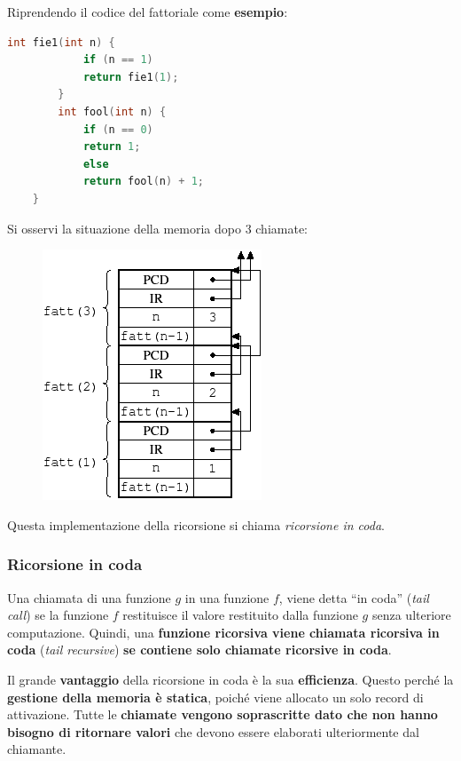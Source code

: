 \documentclass[a4paper]{article}
\newcommand{\dquotes}[1]{``#1''}
\begin{document}
	\noindent
	Riprendendo il codice del fattoriale come \textcolor{Green4}{\textbf{esempio}}:
	\begin{lstlisting}[language=C]
		int fie1(int n) {
			if (n == 1)
			return fie1(1);
		}
		int fool(int n) {
			if (n == 0)
			return 1;
			else
			return fool(n) + 1;
	}\end{lstlisting}
	Si osservi la situazione della memoria dopo 3 chiamate:
	\begin{figure}[!htp]
		\centering
		\includegraphics[width=.5\textwidth]{img/ricorsione.png}
	\end{figure}
	
	\noindent
	Questa implementazione della ricorsione si chiama \emph{ricorsione in coda}.\newpage
	
	\subsubsection{Ricorsione in coda}
	
	Una chiamata di una funzione $g$ in una funzione $f$, viene detta \dquotes{in coda} (\emph{tail call}) se la funzione $f$ restituisce il valore restituito dalla funzione $g$ senza ulteriore computazione. Quindi, una \textbf{funzione ricorsiva viene chiamata \textcolor{Red3}{ricorsiva in coda}} (\emph{tail recursive}) \textbf{se contiene solo chiamate ricorsive in coda}.\newline
	
	\noindent
	Il grande \textcolor{Green4}{\textbf{vantaggio}} della ricorsione in coda è la sua \textbf{efficienza}. Questo perché la \textbf{gestione della memoria è statica}, poiché viene allocato un solo record di attivazione. Tutte le \textbf{chiamate vengono soprascritte dato che non hanno bisogno di ritornare valori} che devono essere elaborati ulteriormente dal chiamante.\newline
	
\end{document}
